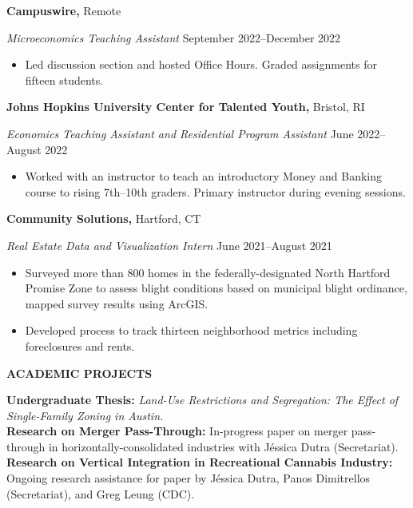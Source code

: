 \documentclass[11pt]{article}
\begin{document}
\vspace{12pt}

\textbf{Campuswire,} \hfill Remote

\textit{Microeconomics Teaching Assistant} \hfill September 2022--December 2022
\begin{itemize}[noitemsep, topsep=0pt, partopsep=0pt, parsep=0pt]
    \item Led discussion section and hosted Office Hours. Graded assignments for fifteen students.
\end{itemize}
\vspace{12pt}

\textbf{Johns Hopkins University Center for Talented Youth,} \hfill Bristol, RI

\textit{Economics Teaching Assistant and Residential Program Assistant} \hfill June 2022--August 2022
\begin{itemize}[noitemsep, topsep=0pt, partopsep=0pt, parsep=0pt]
    \item Worked with an instructor to teach an introductory Money and Banking course to rising 7th--10th graders. Primary instructor during evening sessions.
\end{itemize}

\vspace{12pt}

\textbf{Community Solutions,} \hfill Hartford, CT

\textit{Real Estate Data and Visualization Intern} \hfill June 2021--August 2021
\begin{itemize}[noitemsep, topsep=0pt, partopsep=0pt, parsep=0pt]
    \item Surveyed more than 800 homes in the federally-designated North Hartford Promise Zone to assess blight conditions based on municipal blight ordinance, mapped survey results using ArcGIS.
    \item Developed process to track thirteen neighborhood metrics including foreclosures and rents.
\end{itemize}

\begin{center}
    \textbf{ACADEMIC PROJECTS}
\end{center}

\textbf{Undergraduate Thesis:} \textit{Land-Use Restrictions and Segregation: The Effect of Single-Family Zoning in Austin.}\\
\textbf{Research on Merger Pass-Through:} In-progress paper on merger pass-through in horizontally-consolidated industries with J\'essica Dutra (Secretariat). \\
\textbf{Research on Vertical Integration in Recreational Cannabis Industry:} Ongoing research assistance for paper by J\'essica Dutra, Panos Dimitrellos (Secretariat), and Greg Leung (CDC).
\end{document}
